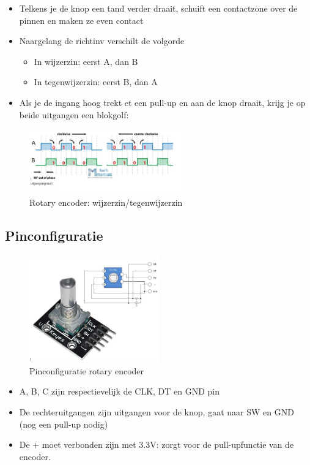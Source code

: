 \documentclass{article}
\begin{document}
\begin{itemize}
    \item Telkens je de knop een tand verder draait, schuift een contactzone over de pinnen en maken ze even contact
    \item Naargelang de richtinv verschilt de volgorde
    \begin{itemize}
        \item In wijzerzin: eerst A, dan B
        \item In tegenwijzerzin: eerst B, dan A
    \end{itemize}
    \item Als je de ingang hoog trekt et een pull-up en aan de knop draait, krijg je op beide uitgangen een blokgolf:
\end{itemize}

\begin{figure}[H]
    \centering
    \includegraphics[width=0.6\textwidth]{rotary-werking.png}
    \caption{Rotary encoder: wijzerzin/tegenwijzerzin}
\end{figure}

\subsection{Pinconfiguratie}

\begin{figure}[H]
    \centering
    \includegraphics[width=0.5\textwidth]{rotary-pins.png}
    \caption{Pinconfiguratie rotary encoder}
\end{figure}

\begin{itemize}
    \item A, B, C zijn respectievelijk de CLK, DT en GND pin
    \item De rechteruitgangen zijn uitgangen voor de knop, gaat naar SW en GND (nog een pull-up nodig)
    \item De + moet verbonden zijn met 3.3V: zorgt voor de pull-upfunctie van de encoder.
\end{itemize}
\end{document}

